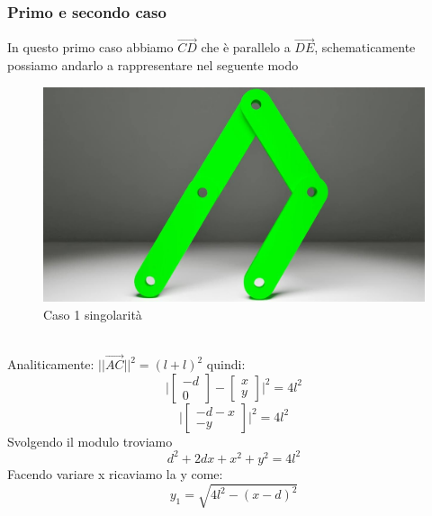 \subsubsection*{Primo e secondo caso}
In questo primo caso abbiamo $\overrightarrow{CD}$ che è parallelo a $\overrightarrow{DE}$, schematicamente possiamo andarlo a rappresentare nel seguente modo
\begin{figure}[ht]
	\begin{center}
		\includegraphics[scale=0.4]{Immagini/Singolarity/1}
		\caption{Caso 1 singolarità}
	\end{center}
\end{figure}
\\Analiticamente: $||\overrightarrow{AC}||^2 = (l+l)^2$ quindi: 
\begin{equation*}
	\Bigg| \begin{bmatrix}
		-d  \\ 0
	\end{bmatrix} - \begin{bmatrix}
	x \\ y
\end{bmatrix}\bigg|^2 = 4l^2
\end{equation*}
\begin{equation*}
\bigg|	\begin{bmatrix}
		-d-x \\ -y
	\end{bmatrix}\Bigg|^2 = 4l^2
\end{equation*}
Svolgendo il modulo troviamo 
\begin{equation*}
	d^2 + 2dx + x^2 +y^2 = 4l^2
\end{equation*}
Facendo variare x ricaviamo la y come:
\begin{equation}
    y_1 = \sqrt{4l^2-(x-d)^2}
\end{equation}
